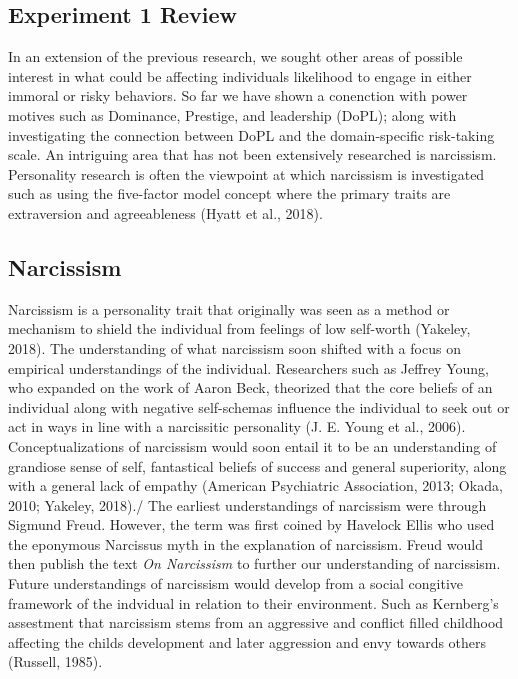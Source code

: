 \documentclass[
  donotrepeattitle,doc, 12pt, a4paper,floatsintext]{apa7}
\begin{document}
\hypertarget{experiment-1-review}{%
\subsection{Experiment 1 Review}\label{experiment-1-review}}

In an extension of the previous research, we sought other areas of possible interest in what could be affecting individuals likelihood to engage in either immoral or risky behaviors. So far we have shown a conenction with power motives such as Dominance, Prestige, and leadership (DoPL); along with investigating the connection between DoPL and the domain-specific risk-taking scale. An intriguing area that has not been extensively researched is narcissism. Personality research is often the viewpoint at which narcissism is investigated such as using the five-factor model concept where the primary traits are extraversion and agreeableness (Hyatt et al., 2018).

\hypertarget{narcissism}{%
\subsection{Narcissism}\label{narcissism}}

Narcissism is a personality trait that originally was seen as a method or mechanism to shield the individual from feelings of low self-worth (Yakeley, 2018). The understanding of what narcissism soon shifted with a focus on empirical understandings of the individual. Researchers such as Jeffrey Young, who expanded on the work of Aaron Beck, theorized that the core beliefs of an individual along with negative self-schemas influence the individual to seek out or act in ways in line with a narcissitic personality (J. E. Young et al., 2006). Conceptualizations of narcissism would soon entail it to be an understanding of grandiose sense of self, fantastical beliefs of success and general superiority, along with a general lack of empathy (American Psychiatric Association, 2013; Okada, 2010; Yakeley, 2018)./
The earliest understandings of narcissism were through Sigmund Freud. However, the term was first coined by Havelock Ellis who used the eponymous Narcissus myth in the explanation of narcissism. Freud would then publish the text \emph{On Narcissism} to further our understanding of narcissism. Future understandings of narcissism would develop from a social congitive framework of the indvidual in relation to their environment. Such as Kernberg's assestment that narcissism stems from an aggressive and conflict filled childhood affecting the childs development and later aggression and envy towards others (Russell, 1985).
\end{document}
